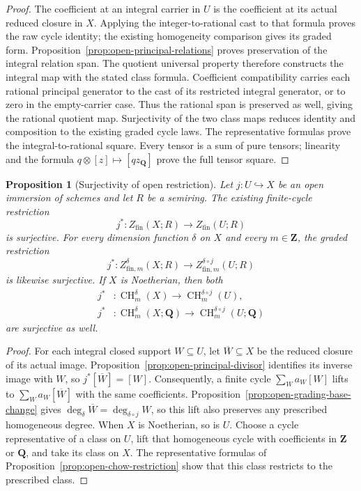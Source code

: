 \documentclass[11pt]{article}
\newtheorem{proposition}[theorem]{Proposition}
\theoremstyle{definition}
\theoremstyle{remark}
\begin{document}
\begin{proof}
The coefficient at an integral carrier in \(U\) is the coefficient
at its actual reduced closure in \(X\). Applying the integer-to-rational
cast to that formula proves the raw cycle identity; the existing
homogeneity comparison gives its graded form.
Proposition~\ref{prop:open-principal-relations} proves preservation
of the integral relation span. The quotient universal property
therefore constructs the integral map with the stated class formula.
Coefficient compatibility carries each rational principal generator
to the cast of its restricted integral generator, or to zero in the
empty-carrier case. Thus the rational span is preserved as well,
giving the rational quotient map. Surjectivity of the two class maps
reduces identity and composition to the existing graded cycle laws.
The representative formulas prove the integral-to-rational square.
Every tensor is a sum of pure tensors; linearity and the formula
\(q\otimes[z]\mapsto[qz_{\mathbf Q}]\) prove the full tensor square.
\end{proof}

\begin{proposition}[Surjectivity of open restriction]
\label{prop:open-restriction-surjective}
Let \(j:U\hookrightarrow X\) be an open immersion of schemes and
let \(R\) be a semiring. The existing finite-cycle restriction
\[
 j^*:Z_{\mathrm{fin}}(X;R)\longrightarrow Z_{\mathrm{fin}}(U;R)
\]
is surjective. For every dimension function \(\delta\) on \(X\)
and every \(m\in\mathbf Z\), the graded restriction
\[
 j^*:Z^\delta_{\mathrm{fin},m}(X;R)
       \longrightarrow Z^{\delta\circ j}_{\mathrm{fin},m}(U;R)
\]
is likewise surjective. If \(X\) is Noetherian, then both
\[
\begin{aligned}
 j^*&:\operatorname{CH}_m^\delta(X)
       \longrightarrow\operatorname{CH}_m^{\delta\circ j}(U),\\
 j^*&:\operatorname{CH}_m^\delta(X;\mathbf Q)
       \longrightarrow\operatorname{CH}_m^{\delta\circ j}(U;\mathbf Q)
\end{aligned}
\]
are surjective as well.
\end{proposition}

\begin{proof}
For each integral closed support \(W\subseteq U\), let
\(\overline W\subseteq X\) be the reduced closure of its actual
image. Proposition~\ref{prop:open-principal-divisor} identifies
its inverse image with \(W\), so \(j^*[\overline W]=[W]\).
Consequently, a finite cycle \(\sum_W a_W[W]\) lifts to
\(\sum_W a_W[\overline W]\) with the same coefficients.
Proposition~\ref{prop:open-grading-base-change} gives
\(\deg_\delta\overline W=\deg_{\delta\circ j}W\), so this lift
also preserves any prescribed homogeneous degree.
When \(X\) is Noetherian, so is \(U\). Choose a cycle representative
of a class on \(U\), lift that homogeneous cycle with coefficients
in \(\mathbf Z\) or \(\mathbf Q\), and take its class on \(X\).
The representative formulas of
Proposition~\ref{prop:open-chow-restriction} show that this class
restricts to the prescribed class.
\end{proof}
\end{document}
